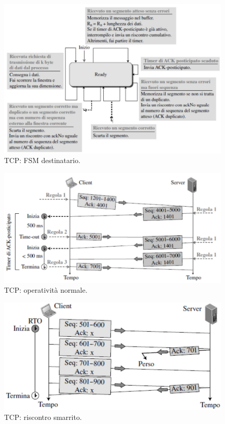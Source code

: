 \documentclass[11pt, italian, openany]{book}
\begin{document}
\begin{sloppypar}
\begin{figure}[!h]
	\centering
	\includegraphics[scale=0.45]{images/tcp-fsm-destinatario.png}
	\caption{TCP: FSM destinatario.}
	\label{fig:tcp-fsm-destinatario}
\end{figure}

\pagebreak

\begin{figure}[!h]
	\centering
	\includegraphics[scale=0.43]{images/tcp-caso-ok.png}
	\caption{TCP: operativit\`a normale.}
	\label{fig:tcp-caso-ok}
\end{figure}

\begin{figure}[!h]
	\centering
	\includegraphics[scale=0.4]{images/tcp-riscontro-smarrito.png}
	\caption{TCP: riscontro smarrito.}
	\label{fig:tcp-riscontro-smarrito}
\end{figure}


\end{sloppypar}
\end{document}

